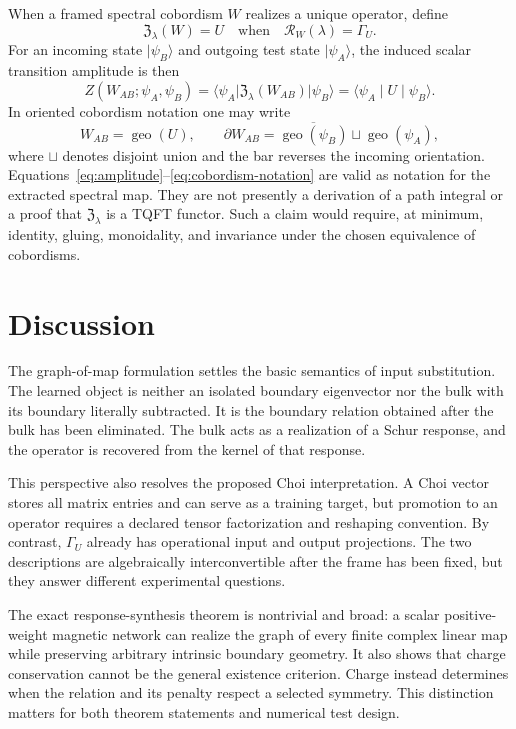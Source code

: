 \documentclass[11pt]{article}
\numberwithin{equation}{section}
\theoremstyle{definition}
\theoremstyle{remark}
\newcommand{\geo}{\operatorname{geo}}
\newcommand{\ket}[1]{\lvert #1\rangle}
\newcommand{\bra}[1]{\langle #1\rvert}
\newcommand{\matrixel}[3]{\langle #1\mid #2\mid #3\rangle}
\begin{document}
When a framed spectral cobordism $W$ realizes a unique operator, define
\begin{equation}
  \mathfrak Z_\lambda(W)=U
  \quad\text{when}\quad
  \mathcal R_W(\lambda)=\Gamma_U.
  \label{eq:operator-valued-Z}
\end{equation}
For an incoming state $\ket{\psi_B}$ and outgoing test state
$\ket{\psi_A}$, the induced scalar transition amplitude is then
\begin{equation}
  Z(W_{AB};\psi_A,\psi_B)
  =\bra{\psi_A}\mathfrak Z_\lambda(W_{AB})\ket{\psi_B}
  =\matrixel{\psi_A}{U}{\psi_B}.
  \label{eq:amplitude}
\end{equation}
In oriented cobordism notation one may write
\begin{equation}
  W_{AB}=\geo(U),
  \qquad
  \partial W_{AB}
  =\overline{\geo(\psi_B)}\sqcup\geo(\psi_A),
  \label{eq:cobordism-notation}
\end{equation}
where $\sqcup$ denotes disjoint union and the bar reverses the incoming
orientation.  Equations~\eqref{eq:amplitude}--\eqref{eq:cobordism-notation} are
valid as notation for the extracted spectral map.  They are not presently a
derivation of a path integral or a proof that $\mathfrak Z_\lambda$ is a TQFT
functor.  Such a claim would require, at minimum, identity, gluing, monoidality,
and invariance under the chosen equivalence of cobordisms.

\section{Discussion}

The graph-of-map formulation settles the basic semantics of input substitution.
The learned object is neither an isolated boundary eigenvector nor the bulk
with its boundary literally subtracted.  It is the boundary relation obtained
after the bulk has been eliminated.  The bulk acts as a realization of a Schur
response, and the operator is recovered from the kernel of that response.

This perspective also resolves the proposed Choi interpretation.  A Choi vector
stores all matrix entries and can serve as a training target, but promotion to
an operator requires a declared tensor factorization and reshaping convention.
By contrast, $\Gamma_U$ already has operational input and output projections.
The two descriptions are algebraically interconvertible after the frame has
been fixed, but they answer different experimental questions.

The exact response-synthesis theorem is nontrivial and broad: a scalar
positive-weight magnetic network can realize the graph of every finite complex
linear map while preserving arbitrary intrinsic boundary geometry.  It also
shows that charge conservation cannot be the general existence criterion.
Charge instead determines when the relation and its penalty respect a selected
symmetry.  This distinction matters for both theorem statements and numerical
test design.
\end{document}
